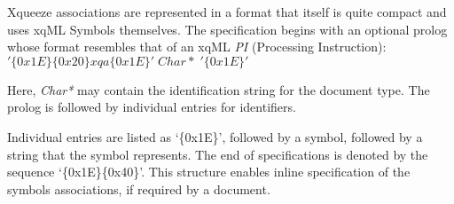 
Xqueeze associations are represented in a format that itself is quite
compact and uses xqML Symbols themselves. The specification begins
with an optional prolog whose format resembles that of an xqML
\textit{PI} (Processing Instruction): \\
\('\{0x1E\}\{0x20\}xqa\{0x1E\}'\;Char*\;'\{0x1E\}' \)

Here, \textit{Char*} may contain the identification string for the
document type. The prolog is followed by individual entries for
identifiers.

Individual entries are listed as `\{0x1E\}', followed by a symbol,
followed by a string that the symbol represents. The end of
specifications is denoted by the sequence `\{0x1E\}\{0x40\}'. This
structure enables inline specification of the symbols associations, if
required by a document.
